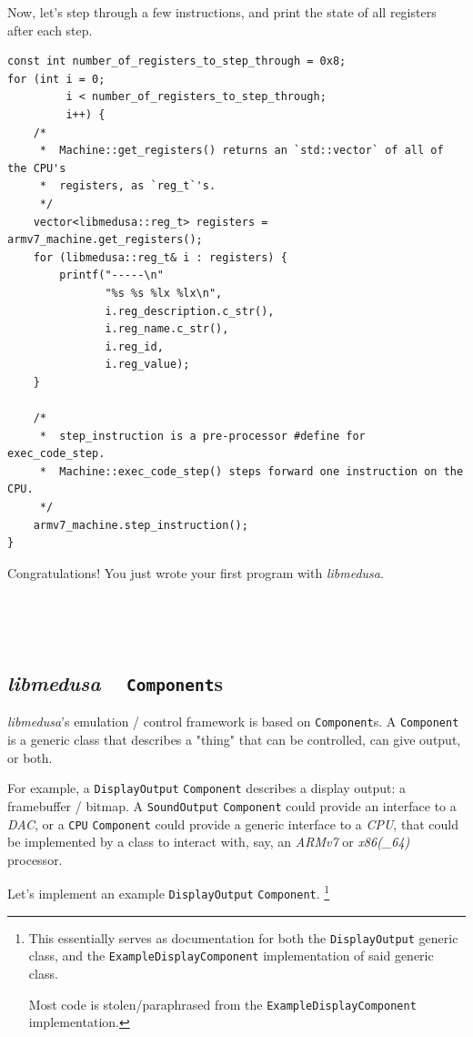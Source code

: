 \documentclass{article}
\begin{document}
	Now, let's step through a few instructions, and print the state of all
	registers after each step.

	\begin{lstlisting}
const int number_of_registers_to_step_through = 0x8;
for (int i = 0;
		 i < number_of_registers_to_step_through;
		 i++) {
	/*
	 *  Machine::get_registers() returns an `std::vector` of all of the CPU's
	 *  registers, as `reg_t`'s.
	 */
	vector<libmedusa::reg_t> registers = armv7_machine.get_registers();
	for (libmedusa::reg_t& i : registers) {
		printf("-----\n"
			   "%s %s %lx %lx\n",
			   i.reg_description.c_str(),
			   i.reg_name.c_str(),
			   i.reg_id,
			   i.reg_value);
	}
	
	/*
	 *  step_instruction is a pre-processor #define for exec_code_step.
	 *  Machine::exec_code_step() steps forward one instruction on the CPU.
	 */
	armv7_machine.step_instruction();
}
	\end{lstlisting}

	Congratulations! You just wrote your first program with \textit{libmedusa}.
	\
	
	\

	\

	\subsection{\textit{libmedusa} ~ \texttt{Component}s}
	\textit{libmedusa}'s emulation / control framework is based on
	\texttt{Component}s. A \texttt{Component} is a generic class that describes
	a "thing" that can be controlled, can give output, or both.

	For example, a \texttt{DisplayOutput} \texttt{Component} describes a display
	output: a framebuffer / bitmap. A \texttt{SoundOutput} \texttt{Component}
	could provide an interface to a \textit{DAC}, or a \texttt{CPU}
	\texttt{Component} could provide a generic interface to a \textit{CPU}, that
	could be implemented by a class to interact with, say, an \textit{ARMv7} or
	\textit{x86(\_64)} processor.

	Let's implement an example \texttt{DisplayOutput} \texttt{Component}.
	\footnote{
		\label{ExampleDisplayComponent1}
		This essentially serves as documentation for both the
		\texttt{DisplayOutput} generic class, and the
		\texttt{ExampleDisplayComponent} implementation of said generic class.

		Most code is stolen/paraphrased from the
		\texttt{ExampleDisplayComponent} implementation.
	}
\end{document}
